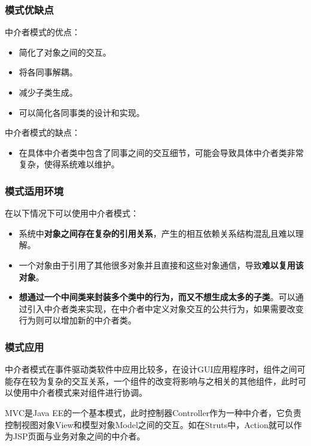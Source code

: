 \subsubsection{模式优缺点}
中介者模式的优点：
\vspace{-0.8em}
\begin{multicols}{2}
    \begin{itemize}
        \item 简化了对象之间的交互。
        \item 将各同事解耦。
        \item 减少子类生成。
        \item 可以简化各同事类的设计和实现。
    \end{itemize}
\end{multicols}
\vspace{-1em}

中介者模式的缺点：
\begin{itemize}
    \item 在具体中介者类中包含了同事之间的交互细节，可能会导致具体中介者类非常复杂，使得系统难以维护。
\end{itemize}

\subsubsection{模式适用环境}
在以下情况下可以使用中介者模式：
\begin{itemize}
    \item 系统中\textbf{对象之间存在复杂的引用关系}，产生的相互依赖关系结构混乱且难以理解。
    \item 一个对象由于引用了其他很多对象并且直接和这些对象通信，导致\textbf{难以复用该对象}。
    \item \textbf{想通过一个中间类来封装多个类中的行为，而又不想生成太多的子类}。可以通过引入中介者类来实现，在中介者中定义对象交互的公共行为，如果需要改变行为则可以增加新的中介者类。
\end{itemize}

\subsubsection{模式应用}
 中介者模式在事件驱动类软件中应用比较多，在设计GUI应用程序时，组件之间可能存在较为复杂的交互关系，一个组件的改变将影响与之相关的其他组件，此时可以使用中介者模式来对组件进行协调。

 MVC是Java EE的一个基本模式，此时控制器Controller作为一种中介者，它负责控制视图对象View和模型对象Model之间的交互。如在Struts中，Action就可以作为JSP页面与业务对象之间的中介者。

